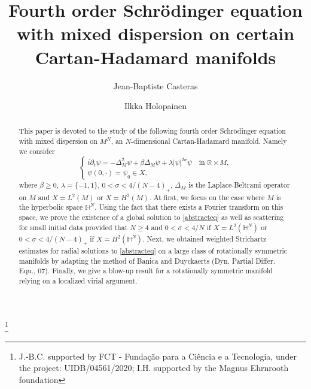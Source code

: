 \documentclass[10pt,leqno]{amsart}
\numberwithin{equation}{section}
\newcommand{\field}[1]{\mathbb{#1}}
\newcommand{\R}{\field{R}}          		%
\newcommand{\Hy}{\field{H}}
\begin{document}
\title[4NLS]{Fourth order Schr\" odinger equation with mixed dispersion on certain Cartan-Hadamard manifolds}
\author[Jean-Baptiste Casteras]{Jean-Baptiste Casteras}
\address{CMAFCIO, Faculdade de Ci\^encias da Universidade de Lisboa, Edificio C6, Piso 1, Campo Grande 1749-016 Lisboa, Portugal}
\author[Ilkka Holopainen]{Ilkka Holopainen}
\address{Department of Mathematics and Statistics, P.O. Box 68, 00014 University of
Helsinki, Finland}
\thanks{J.-B.C. supported by FCT - Funda\c c\~ao para a Ci\^encia e a Tecnologia, under the project: UIDB/04561/2020; I.H. supported by the Magnus Ehrnrooth foundation}


\begin{abstract}
This paper is devoted to the study of the following fourth order Schr\" odinger equation with mixed dispersion on $M^N$, an $N$-dimensional Cartan-Hadamard manifold. Namely we consider
\begin{equation}
\label{abstracteq}\tag{4NLS}
\begin{cases}
i\partial_t\psi = -\Delta_M^2\psi +\beta\Delta_M \psi +\lambda|\psi|^{2\sigma}\psi \quad\text{in }\R\times M,\\
\psi(0,\cdot)=\psi_0\in X,
\end{cases}
\end{equation}
where $\beta \geq 0$, $\lambda=\{-1,1\}$, $0<\sigma < 
4/(N-4)_+$, $\Delta_M$ is the Laplace-Beltrami operator on $M$ and $X=L^2 (M)$ or $X=H^2 (M)$. At first,  we focus on the case where $M$ is the hyperbolic space $\Hy^N$. Using the fact that there exists a Fourier transform on this space, we prove the existence of a global solution to \eqref{abstracteq} as well as scattering for small initial data provided that $N\ge 4$ and $0<\sigma < 4/N$ if $X=L^2 (\Hy^N)$ or $0<\sigma < 4/(N-4)_+$ if $X=H^2 (\Hy^N)$. Next, we obtained weighted Strichartz estimates for radial solutions to \eqref{abstracteq} on a large class of rotationally symmetric manifolds by adapting the method of Banica and Duyckaerts (Dyn. Partial Differ. Equ., 07).
Finally,
we give a blow-up result for a rotationally symmetric manifold relying on a localized virial argument.  
\end{abstract}

\maketitle
\end{document}
